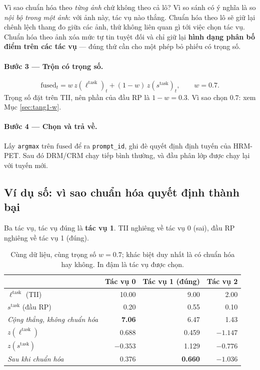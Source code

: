 \documentclass[11pt,a4paper]{article}
\begin{document}
Vì sao chuẩn hóa theo \emph{từng ảnh} chứ không theo cả lô? Vì so sánh có ý nghĩa
là so \emph{nội bộ trong một ảnh}: với ảnh này, tác vụ nào thắng. Chuẩn hóa theo
lô sẽ giữ lại chênh lệch thang đo giữa các ảnh, thứ không liên quan gì tới việc
chọn tác vụ. Chuẩn hóa theo ảnh xóa mức tự tin tuyệt đối và chỉ giữ lại
\textbf{hình dạng phân bố điểm trên các tác vụ} --- đúng thứ cần cho một phép bỏ
phiếu có trọng số.

\paragraph{Bước 3 --- Trộn có trọng số.}
\begin{equation}
\mathrm{fused}_t = w\, z(\ell^{\mathrm{task}})_t
                 + (1-w)\, z(s^{\mathrm{task}})_t ,
\qquad w = 0.7 .
\label{eq:route}
\end{equation}
Trọng số đặt trên TII, nên phần của đầu RP là $1 - w = 0.3$. Vì sao chọn $0.7$:
xem Mục \ref{sec:tang1-w}.

\paragraph{Bước 4 --- Chọn và trả về.}
Lấy \texttt{argmax} trên $\mathrm{fused}$ để ra \texttt{prompt\_id}, ghi đè quyết
định định tuyến của HRM-PET. Sau đó DRM/CRM chạy tiếp bình thường, và đầu phân
lớp được chạy lại với tuyến mới.

\subsection{Ví dụ số: vì sao chuẩn hóa quyết định thành bại}

Ba tác vụ, tác vụ đúng là \textbf{tác vụ 1}. TII nghiêng về tác vụ 0 (sai), đầu
RP nghiêng về tác vụ 1 (đúng).

\begin{table}[htbp]
\centering
\caption{Cùng dữ liệu, cùng trọng số $w = 0.7$; khác biệt duy nhất là có chuẩn
hóa hay không. In đậm là tác vụ được chọn.}
\label{tab:vidu-chuanhoa}
\begin{tabular}{@{}lrrr@{}}
\toprule
 & Tác vụ 0 & Tác vụ 1 (đúng) & Tác vụ 2 \\
\midrule
$\ell^{\mathrm{task}}$ (TII)      & 10.00 & 9.00 & 2.00 \\
$s^{\mathrm{task}}$ (đầu RP)      & 0.20  & 0.55 & 0.10 \\
\midrule
\emph{Cộng thẳng, không chuẩn hóa} & \textbf{7.06} & 6.47 & 1.43 \\
\midrule
$z(\ell^{\mathrm{task}})$          & 0.688 & 0.459 & $-1.147$ \\
$z(s^{\mathrm{task}})$             & $-0.353$ & 1.129 & $-0.776$ \\
\emph{Sau khi chuẩn hóa}           & 0.376 & \textbf{0.660} & $-1.036$ \\
\bottomrule
\end{tabular}
\end{table}
\end{document}
